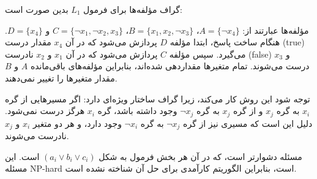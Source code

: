 گراف مؤلفه‌ها برای فرمول $L_1$ بدین صورت است:
\begin{center}
\end{center}

مؤلفه‌ها عبارتند از:
$A = \{\lnot x_4\}$،
$B = \{x_1, x_2, \lnot x_3\}$،
$C = \{\lnot x_1, \lnot x_2, x_3\}$ و
$D = \{x_4\}$.
هنگام ساخت پاسخ،
ابتدا مؤلفه $D$ پردازش می‌شود
که در آن $x_4$ مقدار درست (true) می‌گیرد.
سپس مؤلفه $C$ پردازش می‌شود
که در آن $x_1$ و $x_2$ نادرست (false)
و $x_3$ درست می‌شوند.
تمام متغیرها مقداردهی شده‌اند،
بنابراین مؤلفه‌های باقی‌مانده $A$ و $B$
مقدار متغیرها را تغییر نمی‌دهند.

توجه شود این روش کار می‌کند، زیرا
گراف ساختار ویژه‌ای دارد:
اگر مسیرهایی از گره $x_i$ به گره $x_j$
و از گره $x_j$ به گره $\lnot x_j$ وجود داشته باشد،
گره $x_i$ هرگز درست نمی‌شود.
دلیل این است که مسیری نیز از گره $\lnot x_j$ به گره $\lnot x_i$ وجود دارد،
و هر دو متغیر $x_i$ و $x_j$ نادرست می‌شوند.


مسئله دشوارتر  است،
که در آن هر بخش فرمول به شکل
$(a_i \lor b_i \lor c_i)$
است.
این مسئله NP-hard است، بنابراین الگوریتم کارآمدی
برای حل آن شناخته نشده است.